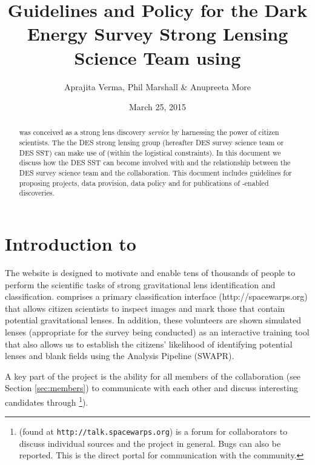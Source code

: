 \documentclass[a4paper,twocolumn]{article}
\begin{document}
             
\title{Guidelines and Policy for the Dark Energy Survey Strong Lensing Science Team using \SW}
\author{Aprajita Verma, Phil Marshall \& Anupreeta More}
\date{March 25, 2015}
\maketitle


\begin{abstract} 
\noindent \sw was conceived as a strong lens
discovery {\it service} by harnessing the power of citizen scientists. The the DES strong lensing group (hereafter DES survey science team or DES SST) can make use of
(within the logistical constraints). In this document we discuss how the DES SST can become involved with \sw and the relationship
between the DES survey science team and the \sw collaboration. 
This document includes guidelines for proposing projects, data provision, data policy and for publications of \sw-enabled discoveries.
\end{abstract}

\setcounter{footnote}{0}


\section{Introduction to \sw}

The \sw website is designed to motivate and  enable tens of thousands of
people to perform the scientific tasks of strong gravitational lens
identification and classification.  \sw comprises a primary classification interface (http://spacewarps.org) that allows citizen scientists to inspect images and mark those that contain potential gravitational lenses. In addition, these volunteers are shown simulated lenses (appropriate for the survey being conducted) as an interactive training tool that also allows us to establish the citizens' likelihood of identifying potential lenses and blank fields using the \sw Analysis Pipeline (SWAPR). 

A key part of the \sw project is the ability for all members of the \sw collaboration (see Section \ref{sec:members}) to communicate with each other and discuss interesting candidates through \Talk\footnote{\Talk (found at \texttt{http://talk.spacewarps.org}) is a forum for \sw collaborators to discuss individual sources and the \sw project in general. Bugs can also be reported. This is the direct portal for communication with the \sw community.}).
\end{document}
